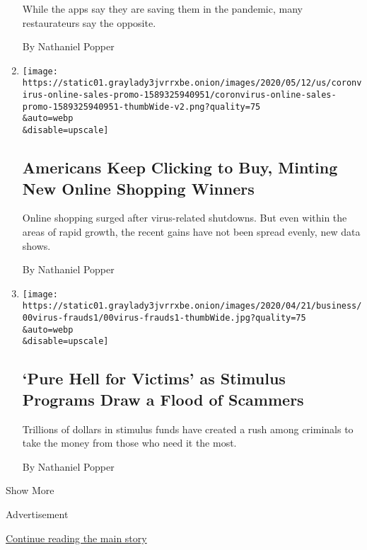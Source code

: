 \begin{enumerate}
  While the apps say they are saving them in the pandemic, many
  restaurateurs say the opposite.

  By Nathaniel Popper
\item
  \href{/interactive/2020/05/13/technology/online-shopping-buying-sales-coronavirus.html}{}

  \texttt{[image: https://static01.graylady3jvrrxbe.onion/images/2020/05/12/us/coronvirus-online-sales-promo-1589325940951/coronvirus-online-sales-promo-1589325940951-thumbWide-v2.png?quality=75\\\&auto=webp\\\&disable=upscale]}

  \hypertarget{americans-keep-clicking-to-buy-minting-new-online-shopping-winners}{%
  \subsection{Americans Keep Clicking to Buy, Minting New Online
  Shopping
  Winners}\label{americans-keep-clicking-to-buy-minting-new-online-shopping-winners}}

  Online shopping surged after virus-related shutdowns. But even within
  the areas of rapid growth, the recent gains have not been spread
  evenly, new data shows.

  By Nathaniel Popper
\item
  \href{/2020/04/22/technology/stimulus-checks-hackers-coronavirus.html}{}

  \texttt{[image: https://static01.graylady3jvrrxbe.onion/images/2020/04/21/business/00virus-frauds1/00virus-frauds1-thumbWide.jpg?quality=75\\\&auto=webp\\\&disable=upscale]}

  \hypertarget{pure-hell-for-victims-as-stimulus-programs-draw-a-flood-of-scammers}{%
  \subsection{`Pure Hell for Victims' as Stimulus Programs Draw a Flood
  of
  Scammers}\label{pure-hell-for-victims-as-stimulus-programs-draw-a-flood-of-scammers}}

  Trillions of dollars in stimulus funds have created a rush among
  criminals to take the money from those who need it the most.

  By Nathaniel Popper
\end{enumerate}

Show More

Advertisement

\protect\hyperlink{after-mid2}{Continue reading the main story}

